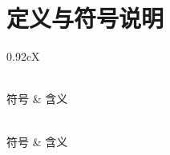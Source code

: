 \documentclass[bwprint]{gmcmthesis}
\numberwithin{equation}{section}
\numberwithin{figure}{section}
\numberwithin{table}{section}
\begin{document}
\section{定义与符号说明}   %
\begin{xltabular}{0.92\textwidth}{cX}
    \caption{主要符号}
    \label{tab:symbols}\\
    \toprule
    符号 & 含义 \\
    \midrule
    \endfirsthead  %

    \\
    \toprule
    符号 & 含义 \\
    \midrule
    \endhead

    \midrule
    \endfoot

    \bottomrule
    \endlastfoot


\end{xltabular}
\end{document}
